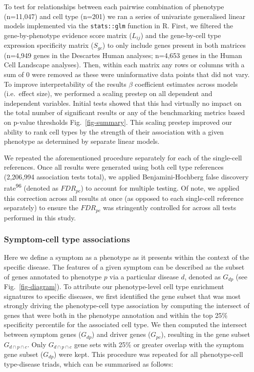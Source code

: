\documentclass[
]{article}
\begin{document}
To test for relationships between each pairwise combination of phenotype
(n=11,047) and cell type (n=201) we ran a series of univariate
generalised linear models implemented via the \texttt{stats::glm}
function in R. First, we filtered the gene-by-phenotype evidence score
matrix (\(L_{ij}\)) and the gene-by-cell type expression specificity
matrix (\(S_{gc}\)) to only include genes present in both matrices
(n=4,949 genes in the Descartes Human analyses; n=4,653 genes in the
Human Cell Landscape analyses). Then, within each matrix any rows or
columns with a sum of 0 were removed as these were uninformative data
points that did not vary. To improve interpretability of the results
\(\beta\) coefficient estimates across models (i.e.~effect size), we
performed a scaling prestep on all dependent and independent variables.
Initial tests showed that this had virtually no impact on the total
number of significant results or any of the benchmarking metrics based
on p-value thresholds Fig.~\ref{fig-summary}. This scaling prestep
improved our ability to rank cell types by the strength of their
association with a given phenotype as determined by separate linear
models.

We repeated the aforementioned procedure separately for each of the
single-cell references. Once all results were generated using both cell
type references (2,206,994 association tests total), we applied
Benjamini-Hochberg false discovery rate\textsuperscript{96} (denoted as
\(FDR_{pc}\)) to account for multiple testing. Of note, we applied this
correction across all results at once (as opposed to each single-cell
reference separately) to ensure the \(FDR_{pc}\) was stringently
controlled for across all tests performed in this study.

\subsubsection{Symptom-cell type
associations}\label{symptom-cell-type-associations}

Here we define a symptom as a phenotype as it presents within the
context of the specific disease. The features of a given symptom can be
described as the subset of genes annotated to phenotype \(p\) via a
particular disease \(d\), denoted as \(G_{dp}\) (see
Fig.~\ref{fig-diagram}). To attribute our phenotype-level cell type
enrichment signatures to specific diseases, we first identified the gene
subset that was most strongly driving the phenotype-cell type
association by computing the intersect of genes that were both in the
phenotype annotation and within the top 25\% specificity percentile for
the associated cell type. We then computed the intersect between symptom
genes (\(G_{dp}\)) and driver genes (\(G_{pc}\)), resulting in the gene
subset \(G_{d \cap p \cap c}\). Only \(G_{d \cap p \cap c}\) gene sets
with 25\% or greater overlap with the symptom gene subset (\(G_{dp}\))
were kept. This procedure was repeated for all phenotype-cell
type-disease triads, which can be summarised as follows:
\end{document}
